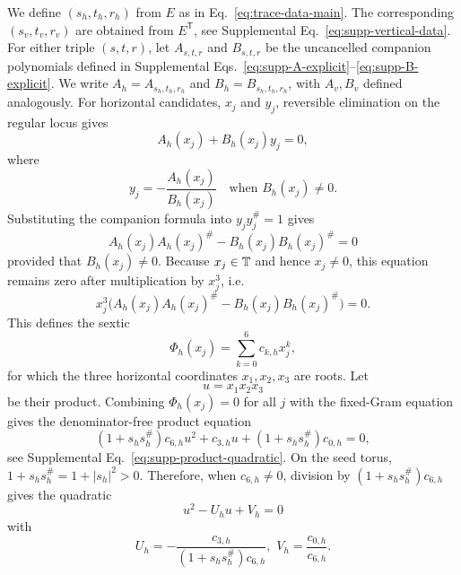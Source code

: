 We define $(s_h,t_h,r_h)$ from $E$ as in Eq.~\eqref{eq:trace-data-main}. The corresponding $(s_v,t_v,r_v)$ are obtained from $E^{\mathsf T}$, see Supplemental Eq.~\eqref{eq:supp-vertical-data}. 
For either triple $(s,t,r)$, let $A_{s,t,r}$ and $B_{s,t,r}$ be the uncancelled companion polynomials defined in Supplemental Eqs.~\eqref{eq:supp-A-explicit}--\eqref{eq:supp-B-explicit}. We write $A_h=A_{s_h,t_h,r_h}$ and $B_h=B_{s_h,t_h,r_h}$, with $A_v,B_v$ defined analogously. For horizontal candidates, $x_j$ and $y_j$, reversible elimination on the regular locus gives
\begin{equation}
A_h(x_j)+B_h(x_j)y_j=0,
\label{eq:regular-companion-relation}
\end{equation}
where 
\begin{equation}
    y_j=-\frac{A_h(x_j)}{B_h(x_j)}\quad\text{when }B_h(x_j)\neq0.
\end{equation}
Substituting the companion formula into $y_jy_j^\#=1$ gives
\begin{equation}
A_h(x_j)A_h(x_j)^\#-B_h(x_j)B_h(x_j)^\#=0
\label{eq:horizontal-companion-phase-condition}
\end{equation}
provided that $B_h(x_j)\neq0$. 
Because $x_j\in\mathbb T$ and hence $x_j\neq0$, this equation remains zero after multiplication by $x_j^3$, i.e. 
\begin{equation}x_{j}^3\bigl(A_h(x_j)A_h(x_j)^\#-B_h(x_j)B_h(x_j)^\#\bigr) = 0.
\label{eq:horizontal-fundamental-sextic}
\end{equation}
This defines the sextic
\begin{equation}
  \Phi_h(x_{j})  =\sum_{k=0}^{6}c_{k,h}x_j^k,
\end{equation}
for which the three horizontal coordinates $x_1,x_2,x_3$ are roots.
Let
\begin{equation}
u=x_1x_2x_3
\label{eq:u}
\end{equation}
be their product. Combining $\Phi_h(x_j) = 0$ for all $j$ with the fixed-Gram equation gives the denominator-free product equation
\begin{equation}
(1+s_hs_h^\#)c_{6,h}u^2+c_{3,h}u+(1+s_hs_h^\#)c_{0,h}=0,
\end{equation}
see Supplemental Eq.~\eqref{eq:supp-product-quadratic}.
On the seed torus, $1+s_hs_h^\#=1+|s_h|^2>0$. Therefore, when $c_{6,h}\neq0$, division by $(1+s_hs_h^\#)c_{6,h}$ gives the quadratic
\begin{equation}
u^2-U_hu+V_h=0
\label{eq:horizontal-product-quadratic}
\end{equation}
with
\begin{equation}
    U_h=-\frac{c_{3,h}}{(1+s_hs_h^\#)c_{6,h}},
\,\,
V_h=\frac{c_{0,h}}{c_{6,h}}.
\end{equation}
